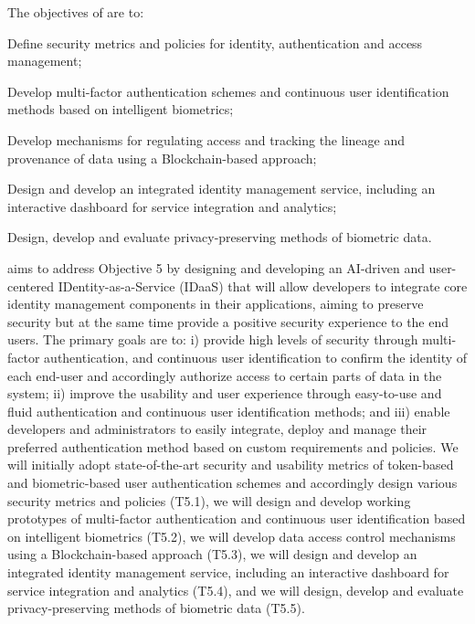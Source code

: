 \addtocounter{wpno}{1}
\begin{Workpackage}{\thewpno}
\WPTitle{\wpname{\thewpno}}

\begin{WPObjectives}
The objectives of \theWP{} are to:
\begin{compactitem}
\item Define security metrics and policies for identity, authentication and access management;
\item Develop multi-factor authentication schemes and continuous user identification methods based on intelligent biometrics;
\item Develop mechanisms for regulating access and tracking the lineage and provenance of data using a Blockchain-based approach;
\item Design and develop an integrated identity management service, including an interactive dashboard for service integration and analytics;
\item Design, develop and evaluate privacy-preserving methods of biometric data.
\end{compactitem}
\end{WPObjectives}

\begin{WPDescription}
\theWP{} aims to address Objective 5 by designing and developing an AI-driven and user-centered IDentity-as-a-Service (IDaaS) that will allow developers to integrate core identity management components in their applications, aiming to preserve security but at the same time provide a positive security experience to the end users. The primary goals are to: i) provide high levels of security through multi-factor authentication, and continuous user identification to confirm the identity of each end-user and accordingly authorize access to certain parts of data in the system; ii) improve the usability and user experience through easy-to-use and fluid authentication and continuous user identification methods; and iii) enable developers and administrators to easily integrate, deploy and manage their preferred authentication method based on custom requirements and policies. We will initially adopt state-of-the-art security and usability metrics of token-based and biometric-based user authentication schemes and accordingly design various security metrics and policies (T5.1), we will design and develop working prototypes of multi-factor authentication and continuous user identification based on intelligent biometrics (T5.2), we will develop data access control mechanisms using a Blockchain-based approach (T5.3), we will design and develop an integrated identity management service, including an interactive dashboard for service integration and analytics (T5.4), and we will design, develop and evaluate privacy-preserving methods of biometric data (T5.5).


\end{WPDescription}
\end{Workpackage}
